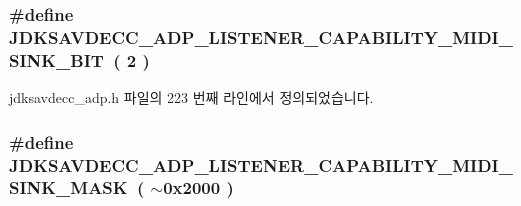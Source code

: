 \subsubsection[{\texorpdfstring{J\+D\+K\+S\+A\+V\+D\+E\+C\+C\+\_\+\+A\+D\+P\+\_\+\+L\+I\+S\+T\+E\+N\+E\+R\+\_\+\+C\+A\+P\+A\+B\+I\+L\+I\+T\+Y\+\_\+\+M\+I\+D\+I\+\_\+\+S\+I\+N\+K\+\_\+\+B\+IT}{JDKSAVDECC_ADP_LISTENER_CAPABILITY_MIDI_SINK_BIT}}]{\setlength{\rightskip}{0pt plus 5cm}\#define J\+D\+K\+S\+A\+V\+D\+E\+C\+C\+\_\+\+A\+D\+P\+\_\+\+L\+I\+S\+T\+E\+N\+E\+R\+\_\+\+C\+A\+P\+A\+B\+I\+L\+I\+T\+Y\+\_\+\+M\+I\+D\+I\+\_\+\+S\+I\+N\+K\+\_\+\+B\+IT~( 2 )}\hypertarget{group__adp__listener__capability_gae419404cabda8b3525ce64ea4844df3a}{}\label{group__adp__listener__capability_gae419404cabda8b3525ce64ea4844df3a}


jdksavdecc\+\_\+adp.\+h 파일의 223 번째 라인에서 정의되었습니다.

\subsubsection[{\texorpdfstring{J\+D\+K\+S\+A\+V\+D\+E\+C\+C\+\_\+\+A\+D\+P\+\_\+\+L\+I\+S\+T\+E\+N\+E\+R\+\_\+\+C\+A\+P\+A\+B\+I\+L\+I\+T\+Y\+\_\+\+M\+I\+D\+I\+\_\+\+S\+I\+N\+K\+\_\+\+M\+A\+SK}{JDKSAVDECC_ADP_LISTENER_CAPABILITY_MIDI_SINK_MASK}}]{\setlength{\rightskip}{0pt plus 5cm}\#define J\+D\+K\+S\+A\+V\+D\+E\+C\+C\+\_\+\+A\+D\+P\+\_\+\+L\+I\+S\+T\+E\+N\+E\+R\+\_\+\+C\+A\+P\+A\+B\+I\+L\+I\+T\+Y\+\_\+\+M\+I\+D\+I\+\_\+\+S\+I\+N\+K\+\_\+\+M\+A\+SK~( $\sim$0x2000 )}\hypertarget{group__adp__listener__capability_gaffe8a468a8f23c5be14b42fc84098749}{}\label{group__adp__listener__capability_gaffe8a468a8f23c5be14b42fc84098749}


